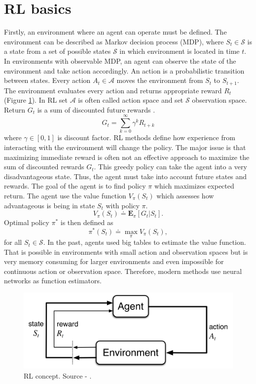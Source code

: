 \section{RL basics}
Firstly, an environment where an agent can operate must be defined. The environment can be described as Markov decision process (MDP), where $S_t \in \mathcal{S}$ is a state from a set of possible states $\mathcal{S}$ in which environment is located in time $t$. In environments with observable MDP, an agent can observe the state of the environment and take action accordingly. An action is a probabilistic transition between states. Every action $A_t \in \mathcal{A}$ moves the environment from $S_t$ to $S_{t+1}$. The environment evaluates every action and returns appropriate reward $R_t$ (Figure \ref{fig:rlconcept}). In RL set $\mathcal{A}$ is often called action space and set $\mathcal{S}$ observation space. Return $G_t$ is a sum of discounted future rewards \cite{sutton2012}.
\begin{equation}
G_t = \sum\limits_{k=0}^{\infty}\gamma^k R_{t+k}
\end{equation}
where $\gamma \in [0,1]$ is discount factor. RL methods define how experience from interacting with the environment will change the policy. The major issue is that maximizing immediate reward is often not an effective approach to maximize the sum of discounted rewards $G_t$. This greedy policy can take the agent into a very disadvantageous state. Thus, the agent must take into account future states and rewards. The goal of the agent is to find policy $\pi$ which maximizes expected return. The agent use the value function $V_{\pi}(S_t)$ which assesses how advantageous is being in state $S_t$ with policy $\pi$.
\begin{equation}
V_{\pi}(S_t) \doteq  \mathbf{E}_\pi[G_t | S_t].
\end{equation}
Optimal policy $\pi^*$ is then defined as
\begin{equation}
\pi^*(S_t) \doteq \max\limits_\pi V_\pi(S_t),
\end{equation}
for all $S_t \in \mathcal{S}$.
In the past, agents used big tables to estimate the value function. That is possible in environments with small action and observation spaces but is very memory consuming for larger environments and even impossible for continuous action or observation space. Therefore, modern methods use neural networks as function estimators.
\begin{figure}[!h]
\centering
\includegraphics[scale=0.3]{fig/RL-concept.png}
\caption[RL concept]{RL concept. Source - \cite{sutton2012}.}
\label{fig:rlconcept}
\end{figure}
\pagebreak

